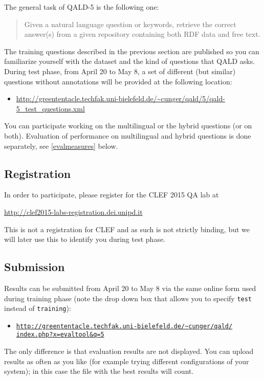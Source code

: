 
The general task of QALD-5 is the following one: 
\begin{quote}
Given a natural language question or keywords, retrieve the correct answer(s) from a given repository containing both RDF data and free text. 
\end{quote}

The training questions described in the previous section are published so you can familiarize yourself with the dataset and the kind of questions that QALD asks. 
During test phase, from April 20 to May 8, a set of different (but similar) questions without annotations will be provided at the following location:
\begin{itemize} 
\item[] \url{http://greententacle.techfak.uni-bielefeld.de/~cunger/qald/5/qald-5_test_questions.xml} 
\end{itemize} 

You can participate working on the multilingual or the hybrid questions (or on both). 
Evaluation of performance on multilingual and hybrid questions is done separately, see \ref{evalmeasures} below.


\subsection{Registration} 

In order to participate, please register for the CLEF 2015 QA lab at 
\begin{center}
\url{http://clef2015-labs-registration.dei.unipd.it}
\end{center} 
This is not a registration for CLEF and as such is not strictly binding, 
but we will later use this to identify you during test phase.


\subsection{Submission}

Results can be submitted from April 20 to May 8 via the same online form used during training phase 
(note the drop down box that allows you to specify {\tt test} instead of {\tt training}):

\begin{itemize}
\item[] \href{http://greententacle.techfak.uni-bielefeld.de/~cunger/qald/index.php?x=evaltool&q=5}{\texttt{http://greententacle.techfak.uni-bielefeld.de/\textasciitilde cunger/qald/\\index.php?x=evaltool\&q=5}}
\end{itemize}
The only difference is that evaluation results are not displayed. 
You can upload results as often as you like (for example trying different configurations of your system); 
in this case the file with the best results will count.

